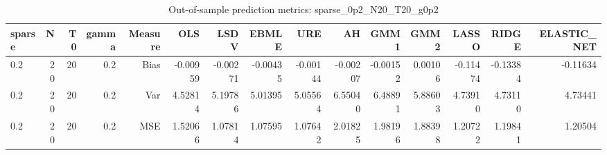 \begin{table}[!htbp]\centering
\caption{Out-of-sample prediction metrics: sparse_0p2_N20_T20_g0p2}
\label{tab:table3_sparse_0p2_N20_T20_g0p2}
\begin{tabular}{lrrrrrrrrrrrrrr}
\hline
sparse & N & T0 & gamma & Measure & OLS & LSDV & EBMLE & URE & AH & GMM1 & GMM2 & LASSO & RIDGE & ELASTIC_NET \\
\hline
0.2 & 20 & 20 & 0.2 & Bias & -0.00959 & -0.00271 & -0.00435 & -0.00144 & -0.00207 & -0.00152 & 0.00106 & -0.11474 & -0.13384 & -0.11634 \\
0.2 & 20 & 20 & 0.2 & Var & 4.52814 & 5.19786 & 5.01395 & 5.05564 & 6.55040 & 6.48891 & 5.88603 & 4.73910 & 4.73110 & 4.73441 \\
0.2 & 20 & 20 & 0.2 & MSE & 1.52066 & 1.07814 & 1.07595 & 1.07642 & 2.01825 & 1.98196 & 1.88398 & 1.20722 & 1.19841 & 1.20504 \\
\hline
\end{tabular}
\end{table}

